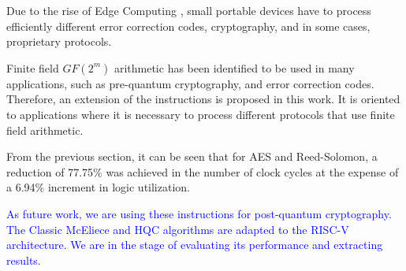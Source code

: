 Due to the rise of Edge Computing \cite{7488250}, small portable devices have to process 
efficiently different error correction codes, cryptography, 
and in some cases, proprietary protocols.

Finite field $GF(2^m)$ arithmetic has been identified to be used in many applications, such as pre-quantum cryptography, and error correction codes. Therefore, an extension of the instructions is proposed in this work. 
It is oriented to applications where it is necessary to process different protocols that use finite field arithmetic.

From the previous section, it can be seen that for AES and Reed-Solomon, a reduction of 77.75\% was achieved 
in the number of clock cycles at the expense of a 6.94\% increment in logic utilization.

\textcolor{blue}{As future work, we are using these instructions for post-quantum cryptography. The Classic McEliece and HQC algorithms are adapted to the RISC-V architecture. We are in the stage of evaluating its performance and extracting results.}

